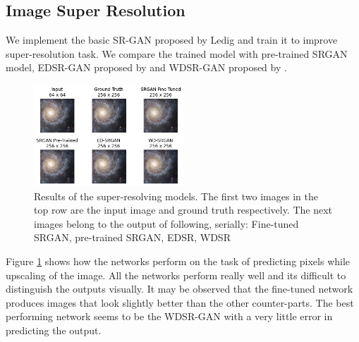 \documentclass{article} %
\begin{document}
    \subsection{Image Super Resolution}
    \hspace*{0.167 in}We implement the basic SR-GAN proposed by Ledig and train it to improve super-resolution task. We compare the trained model with pre-trained SRGAN model, EDSR-GAN proposed by \cite{lim2017enhanced} and WDSR-GAN proposed by \cite{yu2018wide}.
    \begin{figure}[!htb]
    \centering
    	\includegraphics[width=0.5\textwidth]{figures/comparison_upscale}
    	\caption{Results of the super-resolving models. The first two images in the top row are the input image and ground truth respectively. The next images belong to the output of following, serially: Fine-tuned SRGAN, pre-trained SRGAN, EDSR, WDSR}
    	\label{fig: sr_results}
    \end{figure}
    Figure \ref{fig: sr_results} shows how the networks perform on the task of predicting pixels while upscaling of the image. All the networks perform really well and its difficult to distinguish the outputs visually. It may be observed that the fine-tuned network produces images that look slightly better than the other counter-parts. The best performing network seems to be the WDSR-GAN with a very little error in predicting the output. 
\end{document}
